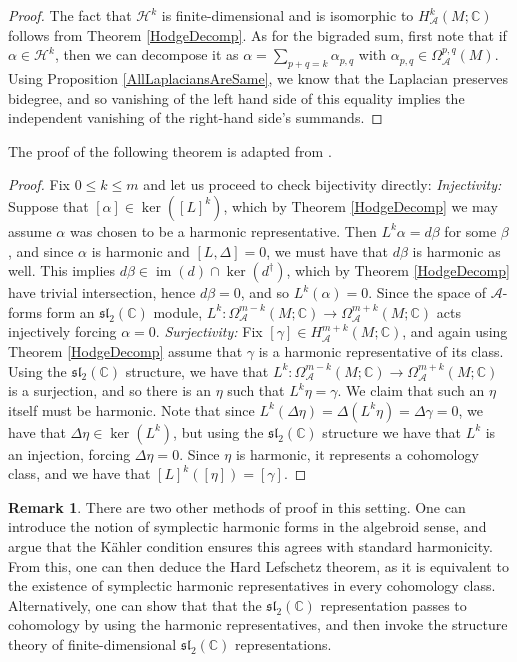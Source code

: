 \documentclass{amsart}
\newcommand{\C}{\mathbb{C}}
\newcommand{\ra}{\rightarrow}
\theoremstyle{definition}
\newtheorem{remark}[theorem]{Remark}
\newcommand{\A}{\mathcal{A}}
\theoremstyle{definition}
\DeclareMathOperator{\im}{im}
\begin{document}
 \decomp*
 
\begin{proof}
    The fact that $\mathcal{H}^k$ is finite-dimensional and is isomorphic to $H_\A^k(M;\C)$ follows from Theorem \ref{HodgeDecomp}. As for the bigraded sum, first note that if $\alpha \in \mathcal{H}^k$, then we can decompose it as $\alpha = \sum_{p+q=k}\alpha_{p,q}$ with $\alpha_{p,q}\in \Omega^{p,q}_\A(M)$. Using Proposition \ref{AllLaplaciansAreSame}, we know that the Laplacian preserves bidegree, and so vanishing of the left hand side of this equality implies the independent vanishing of the right-hand side's summands. 
\end{proof}
The proof of the following theorem is adapted from \cite[Theorem 9.46]{MR4729636}.
\HLT*

\begin{proof} Fix $0 \leq k \leq m$ and let us proceed to check bijectivity directly: \newline
\textit{Injectivity:} Suppose that $[\alpha] \in \ker([L]^k)$, which by Theorem \ref{HodgeDecomp} we may assume $\alpha$ was chosen to be a harmonic representative. Then $L^k \alpha=d\beta$ for some $\beta$, and since $\alpha$ is harmonic and $[L,\Delta]=0$, we must have that $d\beta$ is harmonic as well. This implies $d\beta \in \im(d) \cap \ker(d^\dagger)$, which by Theorem \ref{HodgeDecomp} have trivial intersection, hence $d\beta=0$, and so $L^k(\alpha)=0$. Since the space of $\A$-forms form an $\mathfrak{sl}_2(\C)$ module, $L^k:\Omega_\A^{m-k}(M;\C)\ra \Omega^{m+k}_\A(M;\C)$ acts injectively forcing $\alpha=0$.  \newline 
\textit{Surjectivity:}
Fix $[\gamma] \in H_\A^{m+k}(M;\C)$, and again using Theorem \ref{HodgeDecomp} assume that $\gamma$ is a harmonic representative of its class. Using the $\mathfrak{sl}_2(\C)$ structure, we have that $L^k:\Omega_\A^{m-k}(M;\C)\ra \Omega^{m+k}_\A(M;\C)$ is a surjection, and so there is an $\eta$ such that $L^k \eta = \gamma$. We claim that such an $\eta$ itself must be harmonic. Note that since $ L^k(\Delta\eta) = \Delta (L^k\eta) = \Delta \gamma =0$, we have that $\Delta \eta \in \ker (L^k)$, but using the $\mathfrak{sl}_2(\C)$ structure we have that $L^k$ is an injection, forcing $\Delta \eta =0$. Since $\eta$ is harmonic, it represents a cohomology class, and we have that $[L]^k([\eta])=[\gamma]$.
\end{proof}
\begin{remark}
    There are two other methods of proof in this setting. One can introduce the notion of symplectic harmonic forms in the algebroid sense, and argue that the Kähler condition ensures this agrees with standard harmonicity. From this, one can then deduce the Hard Lefschetz theorem, as it is equivalent to the existence of symplectic harmonic representatives in every cohomology class. Alternatively, one can show that that the $\mathfrak{sl}_2(\C)$ representation passes to cohomology by using the harmonic representatives, and then invoke the structure theory of finite-dimensional $\mathfrak{sl}_2(\C)$ representations.
\end{remark}
\end{document}

